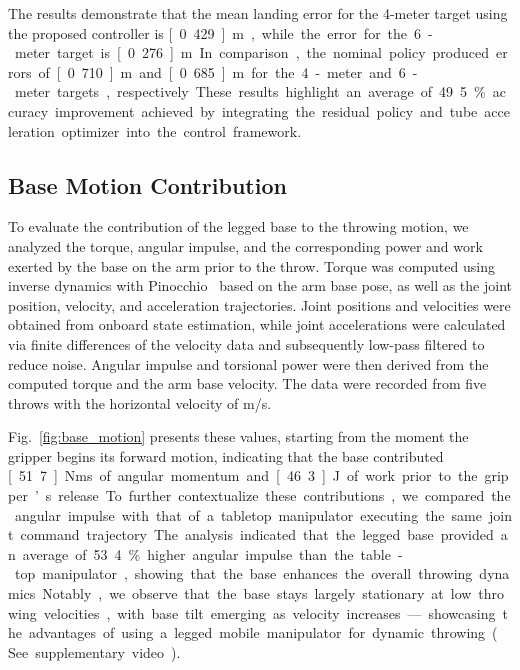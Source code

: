 \documentclass[letterpaper, 10 pt, conference]{ieeeconf} %
\begin{document}
The results demonstrate that the mean landing error for the 4-meter target using the proposed controller is \unit[0.429]{m}, while the error for the 6-meter target is \unit[0.276]{m}. In comparison, the nominal policy produced errors of \unit[0.710]{m} and \unit[0.685]{m} for the 4-meter and 6-meter targets, respectively. These results highlight an average of 49.5\% accuracy improvement achieved by integrating the residual policy and tube acceleration optimizer into the control framework.

\subsection{Base Motion Contribution}

To evaluate the contribution of the legged base to the throwing motion, we analyzed the torque, angular impulse, and the corresponding power and work exerted by the base on the arm prior to the throw. Torque was computed using inverse dynamics with Pinocchio~\cite{carpentier2019pinocchio} based on the arm base pose, as well as the joint position, velocity, and acceleration trajectories. Joint positions and velocities were obtained from onboard state estimation, while joint accelerations were calculated via finite differences of the velocity data and subsequently low-pass filtered to reduce noise. Angular impulse and torsional power were then derived from the computed torque and the arm base velocity. The data were recorded from five throws with the horizontal velocity of \unit[10]{m/s}.



Fig.~\ref{fig:base_motion} presents these values, starting from the moment the gripper begins its forward motion, indicating that the base contributed \unit[51.7]{Nms} of angular momentum and \unit[46.3]{J} of work prior to the gripper’s release. To further contextualize these contributions, we compared the angular impulse with that of a tabletop manipulator executing the same joint command trajectory. The analysis indicated that the legged base provided an average of 53.4\% higher angular impulse than the table-top manipulator, showing that the base enhances the overall throwing dynamics. Notably, we observe that the base stays largely stationary at low throwing velocities, with base tilt emerging as velocity increases—showcasing the advantages of using a legged mobile manipulator for dynamic throwing (See supplementary video). 
\end{document}
